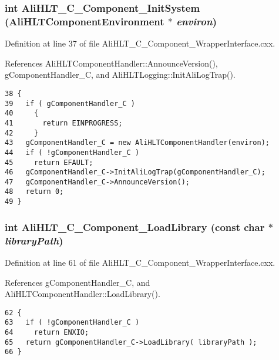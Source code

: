 \subsubsection{\setlength{\rightskip}{0pt plus 5cm}int Ali\-HLT\_\-C\_\-Component\_\-Init\-System ({\bf Ali\-HLTComponent\-Environment} $\ast$ {\em environ})}\label{group__alihlt__wrapper__interface_ga2}




Definition at line 37 of file Ali\-HLT\_\-C\_\-Component\_\-Wrapper\-Interface.cxx.

References Ali\-HLTComponent\-Handler::Announce\-Version(), g\-Component\-Handler\_\-C, and Ali\-HLTLogging::Init\-Ali\-Log\-Trap().

\footnotesize\begin{verbatim}38 {
39   if ( gComponentHandler_C )
40     {
41       return EINPROGRESS;
42     }
43   gComponentHandler_C = new AliHLTComponentHandler(environ);
44   if ( !gComponentHandler_C )
45     return EFAULT;
46   gComponentHandler_C->InitAliLogTrap(gComponentHandler_C);
47   gComponentHandler_C->AnnounceVersion();
48   return 0;
49 }
\end{verbatim}\normalsize 


\subsubsection{\setlength{\rightskip}{0pt plus 5cm}int Ali\-HLT\_\-C\_\-Component\_\-Load\-Library (const char $\ast$ {\em library\-Path})}\label{group__alihlt__wrapper__interface_ga4}




Definition at line 61 of file Ali\-HLT\_\-C\_\-Component\_\-Wrapper\-Interface.cxx.

References g\-Component\-Handler\_\-C, and Ali\-HLTComponent\-Handler::Load\-Library().

\footnotesize\begin{verbatim}62 {
63   if ( !gComponentHandler_C )
64     return ENXIO;
65   return gComponentHandler_C->LoadLibrary( libraryPath );
66 }
\end{verbatim}\normalsize 


